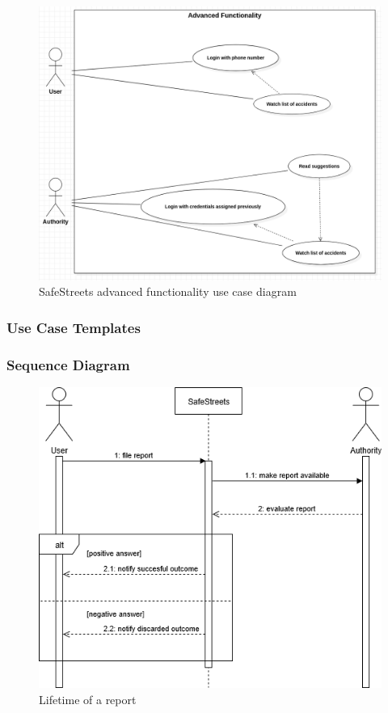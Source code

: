 \begin{figure}
[H]
\includegraphics[width=\textwidth]{Images/Diagrams/UseCase2.png}
\caption{\label{fig:UseCase2}SafeStreets advanced functionality use case diagram}
\end{figure}

\subsubsection{Use Case Templates}

\subsubsection{Sequence Diagram}
\begin{figure}
[H]
\includegraphics[width=\textwidth]{Images/Diagrams/Sequence1.png}
\caption{\label{fig:Sequence1}Lifetime of a report}
\end{figure}

